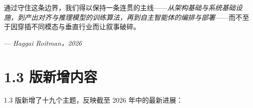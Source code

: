 \documentclass[11pt,a4paper,openany]{book}
\begin{document}
通过守住这条边界，我们得以保持一条连贯的主线——\emph{从架构基础与系统基础设施，到产出对齐与推理模型的训练算法，再到自主智能体的编排与部署}——而不至于因穿插不同模态与垂直行业而让叙事破碎。

--- \emph{Haggai Roitman，2026}

\section*{1.3 版新增内容}
\label{whats-new-v13}

1.3 版新增了十九个主题，反映截至 2026 年中的最新进展：
\end{document}
